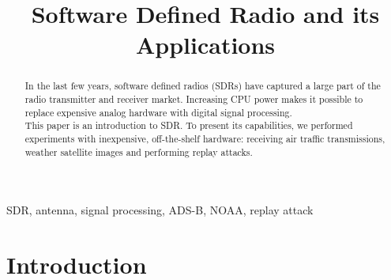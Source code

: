 \documentclass[conference]{IEEEtran}
\begin{document}
\title{Software Defined Radio and its Applications
}

\author{
	\and
}

\maketitle

\begin{abstract}
In the last few years, software defined radios (SDRs) have captured a large part of the radio transmitter and receiver market. Increasing CPU power makes it possible to replace expensive analog hardware with digital signal processing.\\
This paper is an introduction to SDR. To present its capabilities, we performed experiments with inexpensive, off-the-shelf hardware: receiving air traffic transmissions, weather satellite images and performing replay attacks.
\end{abstract}

\begin{IEEEkeywords}
SDR, antenna, signal processing, ADS-B, NOAA, replay attack 
\end{IEEEkeywords}

\section{Introduction} %
\end{document}
